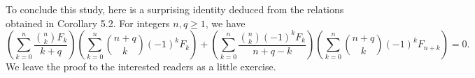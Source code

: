 \documentclass[11pt,reqno]{amsart}
\theoremstyle{plain}
\numberwithin{equation}{section}
\begin{document}
To conclude this study, here is a surprising identity deduced from the relations obtained in Corollary 5.2. For integers $n,q\ge 1$, we have
\begin{equation*}\label{fib_ex}
\left(\sum_{k=0}^n\frac{\binom{n}{k}F_k}{k+q}\right)\left(\sum_{k=0}^n\binom{n+q}{k}(-1)^k F_k\right)+\left(\sum_{k=0}^n\frac{\binom{n}{k}(-1)^k F_{k}}{n+q-k}\right)\left(\sum_{k=0}^n\binom{n+q}{k}(-1)^k F_{n+k}\right)=0.
\end{equation*}
We leave the proof to the interested readers as a little exercise.





\end{document}
